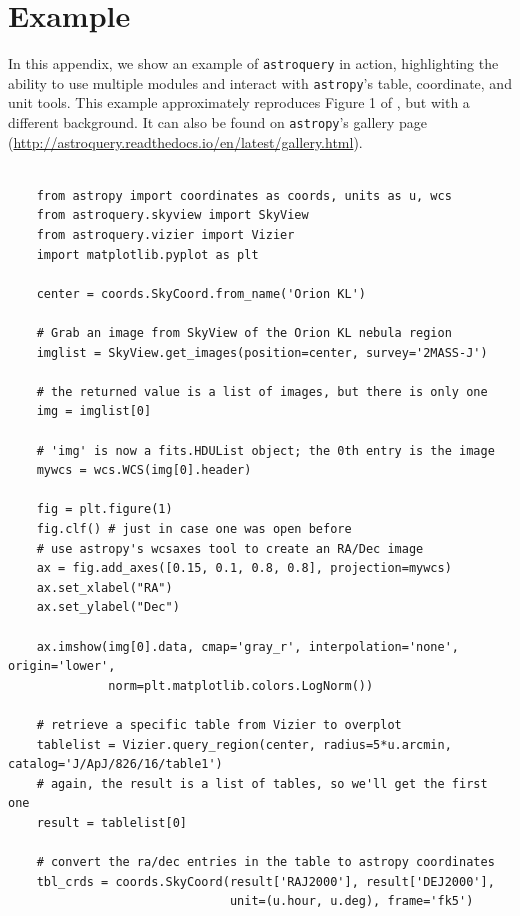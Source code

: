 \documentclass[twocolumn]{aastex61}
\newcommand{\package}[1]{\texttt{#1}\xspace}
\newcommand{\astroquery}{\package{astroquery}}
\newcommand{\astropypkg}{\package{astropy}}
\begin{document}



\appendix
\section{Example}
\label{sec:example}
In this appendix, we show an example of \astroquery in action, highlighting the
ability to use multiple modules and interact with \astropypkg's table, coordinate,
and unit tools.  This example approximately reproduces Figure 1 of
\citet{Eisner2016a}, but with a different background.
It can also be found on \astropypkg's gallery page (\url{http://astroquery.readthedocs.io/en/latest/gallery.html}).

\begin{lstlisting}

    from astropy import coordinates as coords, units as u, wcs
    from astroquery.skyview import SkyView
    from astroquery.vizier import Vizier
    import matplotlib.pyplot as plt

    center = coords.SkyCoord.from_name('Orion KL')

    # Grab an image from SkyView of the Orion KL nebula region
    imglist = SkyView.get_images(position=center, survey='2MASS-J')

    # the returned value is a list of images, but there is only one
    img = imglist[0]

    # 'img' is now a fits.HDUList object; the 0th entry is the image
    mywcs = wcs.WCS(img[0].header)

    fig = plt.figure(1)
    fig.clf() # just in case one was open before
    # use astropy's wcsaxes tool to create an RA/Dec image
    ax = fig.add_axes([0.15, 0.1, 0.8, 0.8], projection=mywcs)
    ax.set_xlabel("RA")
    ax.set_ylabel("Dec")

    ax.imshow(img[0].data, cmap='gray_r', interpolation='none', origin='lower',
              norm=plt.matplotlib.colors.LogNorm())

    # retrieve a specific table from Vizier to overplot
    tablelist = Vizier.query_region(center, radius=5*u.arcmin, catalog='J/ApJ/826/16/table1')
    # again, the result is a list of tables, so we'll get the first one
    result = tablelist[0]

    # convert the ra/dec entries in the table to astropy coordinates
    tbl_crds = coords.SkyCoord(result['RAJ2000'], result['DEJ2000'],
                               unit=(u.hour, u.deg), frame='fk5')


\end{lstlisting}
\end{document}
